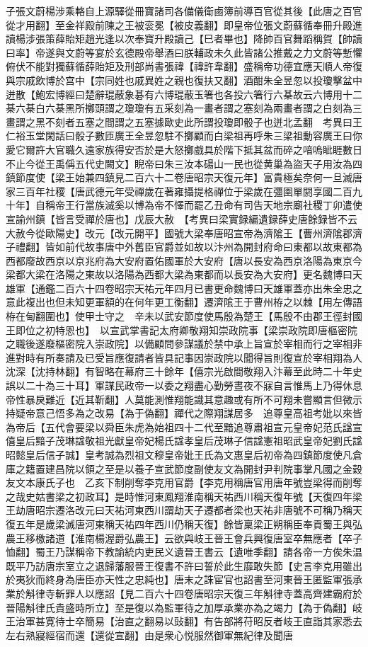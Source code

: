 子張文蔚楊涉乘輅自上源驛從冊寶諸司各備儀衛鹵簿前導百官從其後【此唐之百官從才用翻】至金祥殿前陳之王被衮冕【被皮義翻】即皇帝位張文蔚蘇循奉冊升殿進讀楊涉張策薛貽矩趙光逢以次奉寶升殿讀己【巳者畢也】降帥百官舞蹈稱賀【帥讀曰率】帝遂與文蔚等宴於玄德殿帝舉酒曰朕輔政未久此皆諸公推戴之力文蔚等慙懼俯伏不能對獨蘇循薛貽矩及刑部尚書張禕【禕許韋翻】盛稱帝功德宜應天順人帝復與宗戚飲博於宫中【宗同姓也戚異姓之親也復扶又翻】酒酣朱全昱忽以投瓊擊盆中迸散【鮑宏博經曰楚辭琨蔽象碁有六博琨蔽玉箸也各投六箸行六棊故云六博用十二棊六棊白六棊黑所擲頭謂之瓊瓊有五采刻為一畫者謂之塞刻為兩畫者謂之白刻為三畫謂之黑不刻者五塞之間謂之五塞據歐史此所謂投瓊即骰子也迸北孟翻　考異曰王仁裕玉堂閑話曰骰子數匝廣王全昱忽駐不擲顧而白梁祖再呼朱三梁祖動容廣王曰你愛它爾許大官職久遠家族得安否於是大怒擲戲具於階下抵其盆而碎之喑嗚眦睚數日不止今從王禹偁五代史闕文】睨帝曰朱三汝本碭山一民也從黄巢為盜天子用汝為四鎮節度使【梁王始兼四鎮見二百六十二卷唐昭宗天復元年】富貴極矣奈何一旦滅唐家三百年社稷【唐武德元年受禪歲在著雍攝提格禪位于梁歲在彊圉單閼享國二百九十年】自稱帝王行當族滅奚以博為帝不懌而罷乙丑命有司告天地宗廟社稷丁卯遣使宣諭州鎮【皆言受禪於唐也】戊辰大赦　【考異曰梁實録編遺録薛史唐餘録皆不云大赦今從歐陽史】改元【改元開平】國號大梁奉唐昭宣帝為濟隂王【曹州濟隂郡濟子禮翻】皆如前代故事唐中外舊臣官爵並如故以汴州為開封府命曰東都以故東都為西都廢故西京以京兆府為大安府置佑國軍於大安府【唐以長安為西京洛陽為東京今梁都大梁在洛陽之東故以洛陽為西都大梁為東都而以長安為大安府】更名魏博曰天雄軍【通鑑二百六十四卷昭宗天祐元年四月已書更命魏博曰天雄軍蓋亦出朱全忠之意此複出也但未知更軍額的在何年更工衡翻】遷濟隂王于曹州栫之以棘【用左傳語栫在甸翻圍也】使甲士守之　辛未以武安節度使馬殷為楚王【馬殷不由郡王徑封國王即位之初特恩也】　以宣武掌書記太府卿敬翔知崇政院事【梁崇政院即唐樞密院之職後遂廢樞密院入崇政院】以備顧問參謀議於禁中承上旨宣於宰相而行之宰相非進對時有所奏請及已受旨應復請者皆具記事因崇政院以聞得旨則復宣於宰相翔為人沈深【沈持林翻】有智略在幕府三十餘年【僖宗光啟間敬翔入汴幕至此時二十年史誤以二十為三十耳】軍謀民政帝一以委之翔盡心勤勞晝夜不寐自言惟馬上乃得休息帝性暴戾難近【近其靳翻】人莫能測惟翔能識其意趣或有所不可翔未嘗顯言但微示持疑帝意己悟多為之改易【為于偽翻】禪代之際翔謀居多　追尊皇高祖考妣以來皆為帝后【五代會要梁以舜臣朱虎為始祖四十二代至黯追尊肅祖宣元皇帝妃范氏諡宣僖皇后黯子茂琳諡敬祖光獻皇帝妃楊氏諡孝皇后茂琳子信諡憲祖昭武皇帝妃劉氏諡昭懿皇后信子誠】皇考誠為烈祖文穆皇帝妣王氏為文惠皇后初帝為四鎮節度使凡倉庫之籍置建昌院以領之至是以養子宣武節度副使友文為開封尹判院事掌凡國之金穀友文本康氏子也　乙亥下制削奪李克用官爵【李克用稱唐官用唐年號豈梁得而削奪之哉史姑書梁之初政耳】是時惟河東鳳翔淮南稱天祐西川稱天復年號【天復四年梁王劫唐昭宗遷洛改元曰天祐河東西川謂劫天子遷都者梁也天祐非唐號不可稱乃稱天復五年是歲梁滅唐河東稱天祐四年西川仍稱天復】餘皆稟梁正朔稱臣奉貢蜀王與弘農王移檄諸道【淮南楊渥爵弘農王】云欲與岐王晉王會兵興復唐室卒無應者【卒子恤翻】蜀王乃謀稱帝下教諭統内吏民义遺晉王書云【遺唯季翻】請各帝一方俟朱温既平乃訪唐宗室立之退歸藩服晉王復書不許曰誓於此生靡敢失節【史言李克用雖出於夷狄而終身為唐臣亦天性之忠純也】唐末之誅宦官也詔書至河東晉王匿監軍張承業於斛律寺斬罪人以應詔【見二百六十四卷唐昭宗天復三年斛律寺蓋高齊建霸府於晉陽斛律氏貴盛時所立】至是復以為監軍待之加厚承業亦為之竭力【為于偽翻】岐王治軍甚寛待士卒簡易【治直之翻易以䜴翻】有告部將苻昭反者岐王直詣其家悉去左右熟寢經宿而還【還從宣翻】由是衆心悦服然御軍無紀律及聞唐